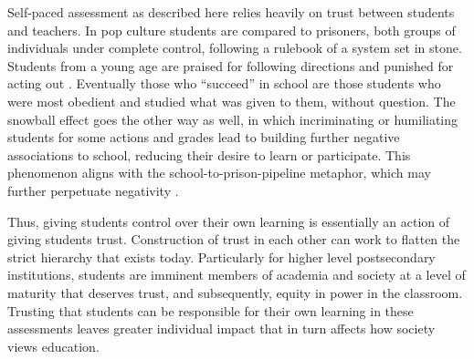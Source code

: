 Self-paced assessment as described here relies heavily on trust between students and teachers. In pop culture students are compared to prisoners, both groups of individuals under complete control, following a rulebook of a system set in stone. Students from a young age are praised for following directions and punished for acting out \citep{inbar_free_1996}. Eventually those who ``succeed'' in school are those students who were most obedient and studied what was given to them, without question. The snowball effect goes the other way as well, in which incriminating or humiliating students for some actions and grades lead to building further negative associations to school, reducing their desire to learn or participate. This phenomenon aligns with the school-to-prison-pipeline metaphor, which may further perpetuate negativity \citep{crawley_examining_2018}.

Thus, giving students control over their own learning is essentially an action of giving students trust. Construction of trust in each other can work to flatten the strict hierarchy that exists today. Particularly for higher level postsecondary institutions, students are imminent members of academia and society at a level of maturity that deserves trust, and subsequently, equity in power in the classroom. Trusting that students can be responsible for their own learning in these assessments leaves greater individual impact that in turn affects how society views education.
